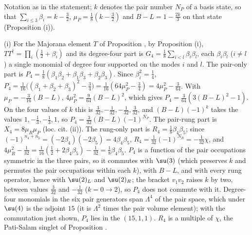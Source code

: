 Notation as in the statement; $k$ denotes the pair number $N_{P}$ of a basis state, so that $\sum_{i \le 3}\beta_{i} = k - \tfrac32$, $\mu_{P} = \tfrac18(k - \tfrac32)$ and $B - L = 1 - \tfrac{2k}{3}$ on that state (Proposition (i)).

(i) For the Majorana element $T$ of Proposition , by Proposition (i), $TT^{\dagger} = \prod_{i}(\tfrac12 + \beta_{i})$ and its degree-four part is $G_{4} = \tfrac18\sum_{i < l}\beta_{i}\beta_{l}$, each $\beta_{i}\beta_{l}$ ($i \ne l$) a single monomial of degree four supported on the modes $i$ and $l$. The pair-only part is $P_{4} = \tfrac18(\beta_{1}\beta_{2} + \beta_{1}\beta_{3} + \beta_{2}\beta_{3})$. Since $\beta_{i}^{2} = \tfrac14$, $P_{4} = \tfrac{1}{16}\bigl((\beta_{1} + \beta_{2} + \beta_{3})^{2} - \tfrac34\bigr) = \tfrac{1}{16}(64\mu_{P}^{2} - \tfrac34) = 4\mu_{P}^{2} - \tfrac{3}{64}$. With $\mu_{P} = -\tfrac{3}{16}(B - L)$, $4\mu_{P}^{2} = \tfrac{9}{64}(B - L)^{2}$, which gives $P_{4} = \tfrac{3}{64}(3(B - L)^{2} - 1)$. On the four values of $k$ this is $\tfrac{3}{32}, -\tfrac{1}{32}, -\tfrac{1}{32}, \tfrac{3}{32}$, and $(B - L)(-1)^{k}$ takes the values $1, -\tfrac13, -\tfrac13, 1$, so $P_{4} = \tfrac{3}{32}(B - L)(-1)^{N_{P}}$. The pair-rung part is $X_{4} = 8\mu_{R}\mu_{P}$ (loc. cit. (ii)). The rung-only part is $R_{4} = \tfrac18\beta_{4}\beta_{5}$; since $(-1)^{n_{4} + n_{5}} = (-2\beta_{4})(-2\beta_{5}) = 4\beta_{4}\beta_{5}$, $R_{4} = \tfrac{1}{32}(-1)^{N_{R}} = -\tfrac{1}{32}\chi$, and $4\mu_{R}^{2} - \tfrac{1}{32} = \tfrac{1}{16}(\tfrac12 + 2\beta_{4}\beta_{5}) - \tfrac{1}{32} = \tfrac18\beta_{4}\beta_{5}$. $P_{4}$ is a function of the pair occupations symmetric in the three pairs, so it commutes with $\su(3)$ (which preserves $k$ and permutes the pair occupations within each $k$), with $B - L$, and with every rung operator, hence with $\su(2)_{L}$ and $\su(2)_{R}$; the bracket $v_{1}v_{2}$ raises $k$ by two, between values $\tfrac{3}{32}$ and $-\tfrac{1}{32}$ ($k = 0 \to 2$), so $P_{4}$ does not commute with it. Degree-four monomials in the six pair generators span $\Lambda^{4}$ of the pair space, which under $\su(4)$ is the adjoint $15$ (it is $\Lambda^{2}$ times the pair volume element); with the commutation just shown, $P_{4}$ lies in the $(15,1,1)$. $R_{4}$ is a multiple of $\chi$, the Pati-Salam singlet of Proposition .

